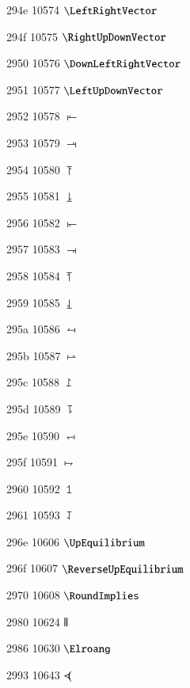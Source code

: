 \documentclass[11pt]{article}
\begin{document}



294e 10574 \ensuremath{\LeftRightVector}

294f 10575 \ensuremath{\RightUpDownVector}

2950 10576 \ensuremath{\DownLeftRightVector}

2951 10577 \ensuremath{\LeftUpDownVector}

2952 10578 \ensuremath{\LeftVectorBar}

2953 10579 \ensuremath{\RightVectorBar}

2954 10580 \ensuremath{\RightUpVectorBar}

2955 10581 \ensuremath{\RightDownVectorBar}

2956 10582 \ensuremath{\DownLeftVectorBar}

2957 10583 \ensuremath{\DownRightVectorBar}

2958 10584 \ensuremath{\LeftUpVectorBar}

2959 10585 \ensuremath{\LeftDownVectorBar}

295a 10586 \ensuremath{\LeftTeeVector}

295b 10587 \ensuremath{\RightTeeVector}

295c 10588 \ensuremath{\RightUpTeeVector}

295d 10589 \ensuremath{\RightDownTeeVector}

295e 10590 \ensuremath{\DownLeftTeeVector}

295f 10591 \ensuremath{\DownRightTeeVector}

2960 10592 \ensuremath{\LeftUpTeeVector}

2961 10593 \ensuremath{\LeftDownTeeVector}

296e 10606 \ensuremath{\UpEquilibrium}

296f 10607 \ensuremath{\ReverseUpEquilibrium}

2970 10608 \ensuremath{\RoundImplies}



2980 10624 \ensuremath{\Vvert}


2986 10630 \ensuremath{\Elroang}

2993 10643 \ensuremath{<\kern-0.58em(}
\end{document}
